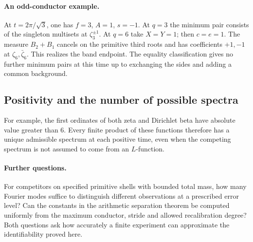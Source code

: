 \documentclass[11pt,letterpaper]{article}
\begin{document}
\paragraph{An odd-conductor example.}
At $t=2\pi/\sqrt3$, one has $f=3$, $A=1$, $s=-1$. At $q=3$ the minimum pair consists of the singleton multisets at $\zeta_3^{\pm1}$. At $q=6$ take $X=Y=1$; then $c=e=1$. The measure $B_2+B_1$ cancels on the primitive third roots and has coefficients $+1,-1$ at $\zeta_6,\bar\zeta_6$. This realizes the band endpoint. The equality classification gives no further minimum pairs at this time up to exchanging the sides and adding a common background.

\subsection*{Positivity and the number of possible spectra}


For example, the first ordinates of both zeta and Dirichlet beta have
absolute value greater than $6$. Every finite product of these functions
therefore has a unique admissible spectrum at each positive time, even
when the competing spectrum is not assumed to come from an $L$-function.



\paragraph{Further questions.}
For competitors on specified primitive shells with bounded total mass, how many Fourier modes suffice to distinguish different observations at a prescribed error level? Can the constants in the arithmetic separation theorem be computed uniformly from the maximum conductor, stride and allowed recalibration degree? Both questions ask how accurately a finite experiment can approximate the identifiability proved here.
\end{document}
